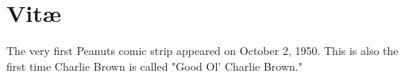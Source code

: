 \chapter*{Vit\ae}


The very first Peanuts comic strip appeared on October 2, 1950.  This is also the first time Charlie Brown is called "Good Ol' Charlie Brown." 


\newpage
